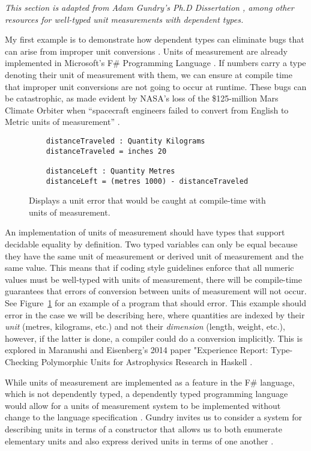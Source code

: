 \textit{This section is adapted from Adam Gundry's Ph.D Dissertation
\cite{gundry2013}, among other resources for well-typed unit measurements with
dependent types.}

My first example is to demonstrate how dependent types can eliminate bugs that
can arise from improper unit conversions \cite{gundry2013}. Units of measurement
are already implemented in Microsoft's F\# Programming Language
\cite{kennedy2009}. If numbers carry a type denoting their unit of measurement
with them, we can ensure at compile time that improper unit conversions are not
going to occur at runtime. These bugs can be catastrophic, as made evident by
NASA's loss of the \$125-million Mars Climate Orbiter when ``spacecraft
engineers failed to convert from English to Metric units of measurement''
\cite{hotz1999}. 

\begin{figure}[ht!]
  \caption{Displays a unit error that would be caught at compile-time with units of measurement.}
  \label{unit_error}
  \begin{lstlisting}
    distanceTraveled : Quantity Kilograms
    distanceTraveled = inches 20

    distanceLeft : Quantity Metres
    distanceLeft = (metres 1000) - distanceTraveled
  \end{lstlisting}
\end{figure}

An implementation of units of measurement should have types that support
decidable equality by definition. Two typed variables can only be equal because
they have the same unit of measurement or derived unit of measurement and the
same value. This means that if coding style guidelines enforce that all numeric
values must be well-typed with units of measurement, there will be compile-time
guarantees that errors of conversion between units of measurement will not
occur. See Figure~\ref{unit_error} for an example of a program that should
error. This example should error in the case we will be describing here, where
quantities are indexed by their \textit{unit} (metres, kilograms, etc.) and not
their \textit{dimension} (length, weight, etc.), however, if the latter is done,
a compiler could do a conversion implicitly. This is explored in Maranushi and
Eisenberg's 2014 paper "Experience Report: Type-Checking Polymorphic Units for
Astrophysics Research in Haskell \cite{eisenberg2014}. 

While units of measurement are implemented as a feature in the F\# language,
which is not dependently typed, a dependently typed programming language would
allow for a units of measurement system to be implemented without change to the
language specification \cite{gundry2013}. Gundry invites us to consider a
system for describing units in terms of a constructor that allows us to both
enumerate elementary units and also express derived units in terms of one
another \cite{gundry2013}. 

